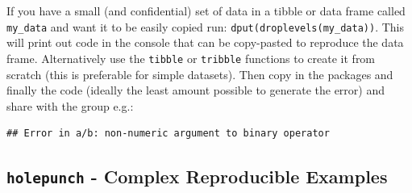 \documentclass[]{book}
\newenvironment{Shaded}{\begin{snugshade}}{\end{snugshade}}
\newcommand{\CommentTok}[1]{\textcolor[rgb]{0.56,0.35,0.01}{\textit{#1}}}
\newcommand{\DataTypeTok}[1]{\textcolor[rgb]{0.13,0.29,0.53}{#1}}
\newcommand{\DecValTok}[1]{\textcolor[rgb]{0.00,0.00,0.81}{#1}}
\newcommand{\KeywordTok}[1]{\textcolor[rgb]{0.13,0.29,0.53}{\textbf{#1}}}
\newcommand{\NormalTok}[1]{#1}
\newcommand{\OperatorTok}[1]{\textcolor[rgb]{0.81,0.36,0.00}{\textbf{#1}}}
\newcommand{\OtherTok}[1]{\textcolor[rgb]{0.56,0.35,0.01}{#1}}
\newcommand{\StringTok}[1]{\textcolor[rgb]{0.31,0.60,0.02}{#1}}
\begin{document}
If you have a small (and confidential) set of data in a tibble or data frame called \texttt{my\_data} and want it to be easily copied run: \texttt{dput(droplevels(my\_data))}. This will print out code in the console that can be copy-pasted to reproduce the data frame. Alternatively use the \texttt{tibble} or \texttt{tribble} functions to create it from scratch (this is preferable for simple datasets). Then copy in the packages and finally the code (ideally the least amount possible to generate the error) and share with the group e.g.:

\begin{Shaded}
\end{Shaded}

\begin{verbatim}
## Error in a/b: non-numeric argument to binary operator
\end{verbatim}

\hypertarget{holepunch---complex-reproducible-examples}{%
\subsection{\texorpdfstring{\texttt{holepunch} - Complex Reproducible Examples}{holepunch - Complex Reproducible Examples}}\label{holepunch---complex-reproducible-examples}}
\end{document}
